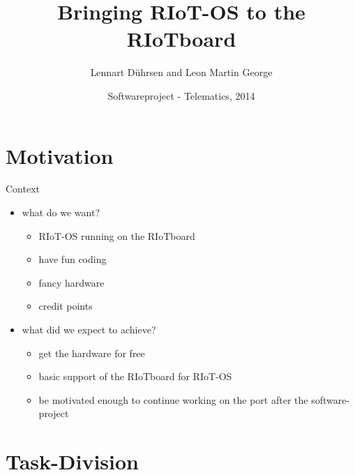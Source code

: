 \documentclass[9pt]{beamer}
\title{Bringing RIoT-OS to the RIoTboard}
\author{Lennart Dührsen and Leon Martin George}
\institute[FU Berlin]{Freie Universität Berlin}
\date{Softwareproject - Telematics, 2014}
\begin{document}
 \begin{frame}[plain]
  \titlepage
 \end{frame}

\section{Motivation}

\begin{frame}{Context}
 \begin{itemize}
 \item what do we want?
 \begin{itemize}
 \item RIoT-OS running on the RIoTboard
 \item have fun coding
 \item fancy hardware
 \item credit points
 \end{itemize}
 \item what did we expect to achieve?
 \begin{itemize}
 \item get the hardware for free
 \item basic support of the RIoTboard for RIoT-OS
 \item be motivated enough to continue working on the port after the software-project
 \end{itemize}
 \end{itemize}
\end{frame}

\section{Task-Division}
\end{document}
